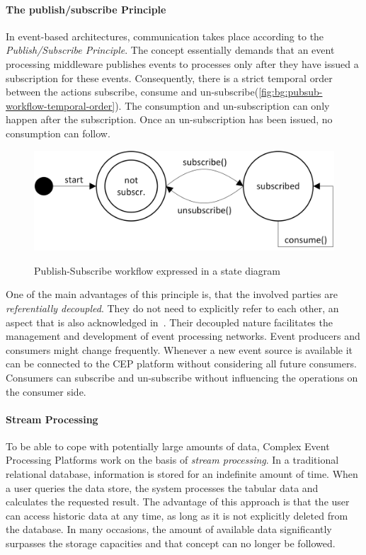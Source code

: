
\paragraph{The publish/subscribe Principle}
In event-based architectures, communication takes place according to the \textit{Publish/Subscribe Principle}.
The concept essentially demands that an event processing middleware publishes events to processes only after they have issued a subscription for these events.
Consequently, there is a strict temporal order between the actions subscribe, consume and un-subscribe(\autoref{fig:bg:pubsub-workflow-temporal-order}). The consumption and un-subscription can only happen after the subscription. Once an un-subscription has been issued, no consumption can follow.~\cite{tanenbaum:2007}


\begin{figure}[]
	\myfloatalign
	{\includegraphics[width=0.6\linewidth]{chapters/background/pub-sub-statemachine.png}}
	\caption{Publish-Subscribe workflow expressed in a state diagram}
	\label{fig:bg:pubsub-workflow-temporal-order}
\end{figure}


One of the main advantages of this principle is, that the involved parties are \textit{referentially decoupled}. They do not need to explicitly refer to each other, an aspect that is also acknowledged in~\cite{evtprocessing}.
Their decoupled nature facilitates the management and development of event processing networks. Event producers and consumers might change frequently.
Whenever a new event source is available it can be connected to the CEP platform without considering all future consumers. Consumers can subscribe and un-subscribe without influencing the operations on the consumer side.


\paragraph{Stream Processing}
To be able to cope with potentially large amounts of data, Complex Event Processing Platforms work on the basis of \textit{stream processing}.
In a traditional relational database, information is stored for an indefinite amount of time. When a user queries the data store, the system processes the tabular data and calculates the requested result. 
The advantage of this approach is that the user can access historic data at any time, as long as it is not explicitly deleted from the database.
In many occasions, the amount of available data significantly surpasses the storage capacities and that concept can no longer be followed.

